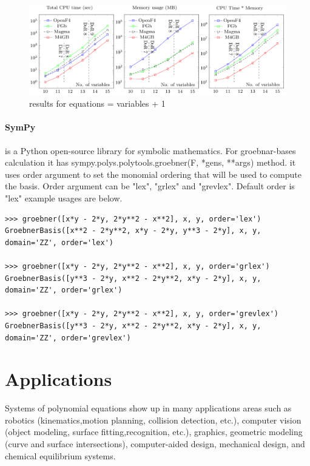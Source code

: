 \documentclass[11pt]{article}
\begin{document}
\begin{figure}[H]
  \begin{center}
    \includegraphics[width=\linewidth]{m4gb_m_n_1.png}
    \caption{results for equations = variables + 1}
    \label{fig:m4gb_m_n_1}
  \end{center}
\end{figure}
\paragraph{SymPy}\cite{sympyarticle}
is a Python open-source library for symbolic mathematics. For groebnar-bases calculation it has sympy.polys.polytools.groebner(F, *gens, **args) method.
it uses order argument to set the monomial ordering that will be used to compute the basis. Order argument can be "lex", "grlex" and "grevlex". Default order is "lex"
example usages are below.
\begin{verbatim}
>>> groebner([x*y - 2*y, 2*y**2 - x**2], x, y, order='lex')
GroebnerBasis([x**2 - 2*y**2, x*y - 2*y, y**3 - 2*y], x, y, domain='ZZ', order='lex')

>>> groebner([x*y - 2*y, 2*y**2 - x**2], x, y, order='grlex')
GroebnerBasis([y**3 - 2*y, x**2 - 2*y**2, x*y - 2*y], x, y, domain='ZZ', order='grlex')

>>> groebner([x*y - 2*y, 2*y**2 - x**2], x, y, order='grevlex')
GroebnerBasis([y**3 - 2*y, x**2 - 2*y**2, x*y - 2*y], x, y, domain='ZZ', order='grevlex')
\end{verbatim}

\section{Applications}
Systems of polynomial equations show up in many applications areas such as robotics (kinematics,motion planning, collision detection, etc.), computer vision (object modeling, surface fitting,recognition, etc.), graphics, geometric modeling (curve and surface intersections), computer-aided design, mechanical design, and chemical equilibrium systems. \cite{yanbinjiaArticle}
\end{document}
